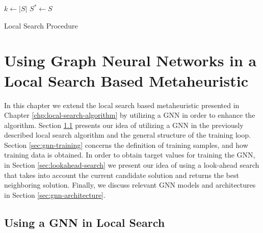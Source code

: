 \documentclass[draft,final]{vutinfth} %
\begin{document}
\begin{algorithm}
    \DontPrintSemicolon
    $k \gets |S|$ \;
    $S^* \gets S$ \;
    \caption{Local Search Procedure}
    \label{alg:local-search-procedure}
\end{algorithm}

\chapter{Using Graph Neural Networks in a Local Search Based Metaheuristic}\label{chp:gnn}

In this chapter we extend the local search based metaheuristic presented in Chapter \ref{chp:local-search-algorithm} by utilizing a GNN in order to enhance the algorithm. 
Section \ref{sec:gnn-local-search} presents our idea of utilizing a GNN in the previously described local search algorithm and the general structure of the training loop. 
Section \ref{sec:gnn-training} concerns the definition of training samples, and how training data is obtained. 
In order to obtain target values for training the GNN, in Section \ref{sec:lookahead-search} we present our idea of using a look-ahead search that takes into account the current candidate solution and returns the best neighboring solution. 
Finally, we discuss relevant GNN models and architectures in Section \ref{sec:gnn-architecture}.


\section{Using a GNN in Local Search}\label{sec:gnn-local-search}
\end{document}
